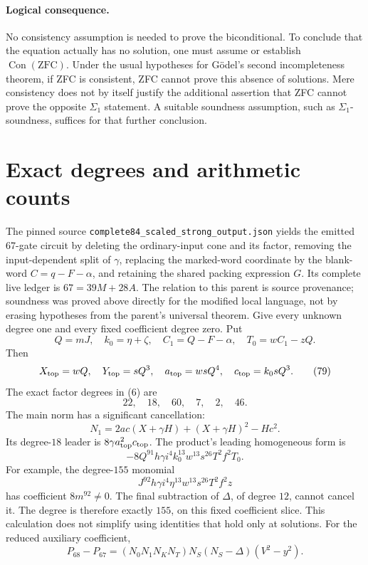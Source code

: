 \documentclass[11pt,a4paper]{article}
\theoremstyle{definition}
\theoremstyle{remark}
\newcommand{\Con}{\operatorname{Con}}
\newcommand{\pathref}[1]{\nolinkurl{#1}}
\newcommand{\Pbase}{P_{67}}
\newcommand{\Plow}{P_{68}}
\begin{document}
\paragraph{Logical consequence.}
No consistency assumption is needed to prove the biconditional.
To conclude that the equation actually has no solution, one must
assume or establish \(\Con(\mathrm{ZFC})\).
Under the usual hypotheses for G\"odel's second incompleteness
theorem, if ZFC is consistent, ZFC cannot prove this absence of
solutions. Mere consistency does not by itself justify the
additional assertion that ZFC cannot prove the opposite
\(\Sigma_1\) statement. A suitable soundness assumption, such as
\(\Sigma_1\)-soundness, suffices for that further conclusion.

\section{Exact degrees and arithmetic counts}\label{sec:degrees}
The pinned source
\pathref{complete84_scaled_strong_output.json} yields the emitted
67-gate circuit by deleting the
ordinary-input cone and its factor, removing the input-dependent
split of \(\gamma\), replacing the marked-word coordinate by the
blank-word \(C=q-F-\alpha\), and retaining the shared packing
expression \(G\). Its complete live ledger is
\(67=39M+28A\). The relation to this parent is source provenance;
soundness was proved above directly for the modified local language,
not by erasing hypotheses from the parent's universal theorem.
Give every unknown degree one and every fixed coefficient degree
zero. Put
\[
 Q=mJ,\quad k_0=\eta+\zeta,\quad C_1=Q-F-\alpha,\quad
 T_0=wC_1-zQ. \tag{78}
\]
Then
\[
 X_{\rm top}=wQ,\quad Y_{\rm top}=sQ^3,\quad
 a_{\rm top}=wsQ^4,\quad c_{\rm top}=k_0sQ^3. \tag{79}
\]
The exact factor degrees in (6) are
\[
 22,\quad18,\quad60,\quad7,\quad2,\quad46. \tag{80}
\]
The main norm has a significant cancellation:
\[
 N_1=2ac(X+\gamma H)+(X+\gamma H)^2-Hc^2. \tag{81}
\]
Its degree-\(18\) leader is \(8\gamma a_{\rm top}^2c_{\rm top}\).
The product's leading homogeneous form is
\[
 -8Q^{91}h\gamma i^4k_0^{13}w^{13}s^{26}T^2f^2T_0. \tag{82}
\]
For example, the degree-\(155\) monomial
\[
 J^{92}h\gamma i^4\eta^{13}w^{13}s^{26}T^2f^2z \tag{83}
\]
has coefficient \(8m^{92}\ne0\). The final subtraction of
\(\Delta\), of degree \(12\), cannot cancel it. The degree is
therefore exactly \(155\), on this fixed coefficient slice.
This calculation does not simplify using identities that hold
only at solutions.
For the reduced auxiliary coefficient,
\[
 \Plow-\Pbase=
 (N_0N_1N_KN_T)N_S(N_S-\Delta)(V^2-y^2). \tag{84}
\]
\end{document}
